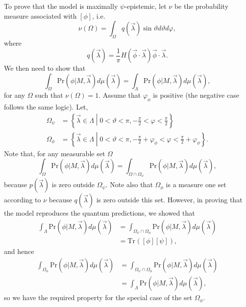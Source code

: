 \documentclass[DIV=calc,fontsize=12pt]{scrartcl} %
\theoremstyle{definition}
\theoremstyle{plain}
\newcommand{\Proj}[1]{\ensuremath{\left [ #1 \right ]}}
\newcommand{\Tr}[2][]{\ensuremath{\text{Tr}_{#1} \left ( #2 \right )}}
\begin{document}
To prove that the model is maximally $\psi$-epistemic, let $\nu$ be
the probability measure associated with $\Proj{\phi}$, i.e.
\begin{equation}
\nu(\Omega) = \int_{\Omega} q(\vec{\lambda}) \sin \vartheta
d\vartheta d\varphi,
\end{equation}
where
\begin{equation}
q(\vec{\lambda}) = \frac{1}{\pi} H \left ( \vec{\phi} \cdot
\vec{\lambda} \right ) \vec{\phi} \cdot \vec{\lambda}.
\end{equation}
We then need to show that
\begin{equation}
\int_{\Omega} \text{Pr}(\phi|M,\vec{\lambda}) d\mu(\vec{\lambda}) =
\int_{\Lambda} \text{Pr}(\phi|M,\vec{\lambda}) d\mu(\vec{\lambda}),
\end{equation}
for any $\Omega$ such that $\nu(\Omega) = 1$.  Assume that
$\varphi_{\phi}$ is positive (the negative case follows the same
logic).  Let,
\begin{align}
\Omega_{\psi} & = \left \{ \vec{\lambda} \in \Lambda \middle | 0<
\vartheta < \pi, - \frac{\pi}{2} < \varphi <
\frac{\pi}{2} \right \} \\
\Omega_{\phi} & = \left \{ \vec{\lambda} \in \Lambda \middle | 0<
\vartheta < \pi, -\frac{\pi}{2} + \varphi_{\phi} < \varphi <
\frac{\pi}{2} + \varphi_{\phi} \right \}.
\end{align}
Note that, for any measurable set $\Omega$
\begin{equation}
\int_{\Omega} \text{Pr}(\phi|M,\vec{\lambda}) d\mu(\vec{\lambda})=
\int_{\Omega \cap \Omega_{\psi}} \text{Pr}(\phi|M,\vec{\lambda})
d\mu(\vec{\lambda}),
\end{equation}
because $p(\vec{\lambda})$ is zero outside $\Omega_{\psi}$.  Note also
that $\Omega_{\phi}$ is a measure one set according to $\nu$ because
$q(\vec{\lambda})$ is zero outside this set.  However, in proving that
the model reproduces the quantum predictions, we showed that
\begin{align}
\int_{\Lambda} \text{Pr}(\phi|M,\vec{\lambda}) d\mu(\vec{\lambda}) &=
\int_{\Omega_{\psi} \cap \Omega_{\phi}} \text{Pr}(\phi|M,\vec{\lambda})
d\mu(\vec{\lambda}) \\
&= \Tr{\Proj{\phi}\Proj{\psi}},
\end{align}
and hence
\begin{align}
\int_{\Omega_{\phi}} \text{Pr}(\phi|M,\vec{\lambda}) d\mu(\vec{\lambda})
&= \int_{\Omega_{\psi} \cap \Omega_{\phi}}
\text{Pr}(\phi|M,\vec{\lambda}) d\mu(\vec{\lambda}) \\
&= \int_{\Lambda}
\text{Pr}(\phi|M,\vec{\lambda}) d\mu(\vec{\lambda}),
\end{align}
so we have the required property for the special case of the set
$\Omega_{\phi}$.
\end{document}
